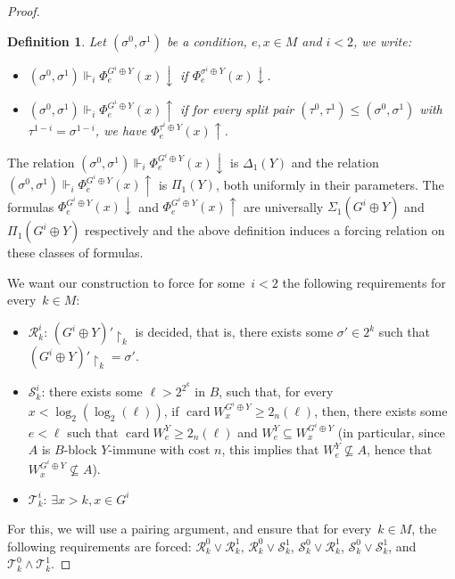 \documentclass{article}
\def\R{\mathcal{R}}
\def\T{\mathcal{T}}
\def\S{\mathcal{S}}
\newcommand{\uh}{\upharpoonright}
\newcommand{\card}{\operatorname{card}}
\numberwithin{theorem}{section}
\newtheorem{definition}[theorem]{Definition}
\begin{document}
\begin{proof}
\begin{definition}
Let $(\sigma^0, \sigma^1)$ be a condition, $e, x \in M$ and $i < 2$, we write:
\begin{itemize}
    \item $(\sigma^0, \sigma^1) \Vdash_i \Phi_e^{G^i \oplus Y}(x) \downarrow$ if $\Phi_e^{\sigma^i \oplus Y}(x) \downarrow$. 
    \item $(\sigma^0, \sigma^1) \Vdash_i \Phi_e^{G^i \oplus Y}(x) \uparrow$ if for every split pair $(\tau^0, \tau^1) \leq (\sigma^0, \sigma^1)$ with $\tau^{1-i} = \sigma^{1-i}$, we have $\Phi_e^{\tau^i \oplus Y}(x)\uparrow$. 
\end{itemize}   
\end{definition}

The relation $(\sigma^0, \sigma^1) \Vdash_i \Phi_e^{G^i \oplus Y}(x) \downarrow$ is $\Delta_1(Y)$ and the relation $(\sigma^0, \sigma^1) \Vdash_i \Phi_e^{G^i \oplus Y}(x) \uparrow$ is $\Pi_1(Y)$, both uniformly in their parameters. The formulas $\Phi_e^{G^i \oplus Y}(x) \downarrow$ and $\Phi_e^{G^i \oplus Y}(x) \uparrow$ are universally $\Sigma_1(G^i \oplus Y)$ and $\Pi_1(G^i \oplus Y)$ respectively and the above definition induces a forcing relation on these classes of formulas. 


We want our construction to force for some~$i < 2$ the following requirements for every~$k \in M$:
\begin{itemize}
    \item $\mathcal{R}^i_k$: $(G^i \oplus Y)' \uh_k$ is decided, that is, there exists some $\sigma' \in 2^k$ such that $(G^i \oplus Y)' \uh_k = \sigma'$.
    \item $\mathcal{S}^i_{k}$: there exists some $\ell > 2^{2^k}$ in $B$, such that, for every $x < \log_2(\log_2(\ell))$, if $\card W^{G^i \oplus Y}_x \geq 2_n(\ell)$, then, there exists some $e < \ell$ such that $\card W_e^Y \geq 2_n(\ell)$ and $W_e^Y \subseteq W_x^{G^i \oplus Y}$ (in particular, since  $A$ is $B$-block $Y$-immune with cost $n$, this implies that $W_e^Y \not \subseteq A$, hence that $W^{G^i \oplus Y}_x \not \subseteq A$).
    \item $\mathcal{T}^i_k$: $\exists x > k, x \in G^i$
\end{itemize}
For this, we will use a pairing argument, and ensure that for every~$k \in M$, the following requirements are forced: $\R^0_k \vee \R^1_k$, $\R^0_k \vee \S^1_k$, $\S^0_k \vee \R^1_k$, $\S^0_k \vee \S^1_k$, and $\T^0_k \wedge \T^1_k$. 


\end{proof}
\end{document}
